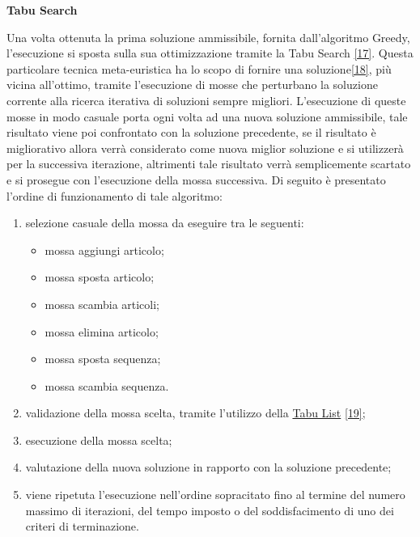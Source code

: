 \textbf{Tabu Search}

Una volta ottenuta la prima soluzione ammissibile, fornita dall'algoritmo Greedy, l'esecuzione si sposta sulla sua ottimizzazione tramite la Tabu Search \hyperref[tabu]{[17]}.
Questa particolare tecnica meta-euristica ha lo scopo di fornire una soluzione\hyperref[scheduling]{[18]}, più vicina all'ottimo, tramite l'esecuzione di mosse che perturbano
la soluzione corrente alla ricerca iterativa di soluzioni sempre migliori. L'esecuzione di queste mosse in modo casuale porta ogni volta ad una nuova soluzione ammissibile, tale risultato viene poi confrontato con la soluzione
precedente, se il risultato è migliorativo allora verrà considerato come nuova miglior soluzione e si utilizzerà per la successiva iterazione, altrimenti tale risultato 
verrà semplicemente scartato e si prosegue con l'esecuzione della mossa successiva. Di seguito è presentato l'ordine di funzionamento di tale algoritmo:
\begin{enumerate}
    \item selezione casuale della mossa da eseguire tra le seguenti:
    \begin{itemize}
        \item mossa aggiungi articolo;
        \item mossa sposta articolo;
        \item mossa scambia articoli;
        \item mossa elimina articolo;
        \item mossa sposta sequenza; 
        \item mossa scambia sequenza.  
    \end{itemize}
    \item validazione della mossa scelta, tramite l'utilizzo della \hyperref[Tabu List]{Tabu List\glo} \hyperref[list]{[19]};
    \item esecuzione della mossa scelta;
    \item valutazione della nuova soluzione in rapporto con la soluzione precedente;
    \item viene ripetuta l'esecuzione nell'ordine sopracitato fino al termine del numero massimo di iterazioni, del tempo imposto o del soddisfacimento di uno dei criteri di
    terminazione.\\
\end{enumerate}


